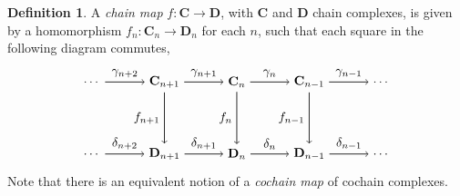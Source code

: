 \documentclass[11.5pt, twoside, a4paper, titlepage]{report}
\providecommand{\equ}[0]{\begin{equation*}}
\providecommand{\eequ}[0] {\end{equation*}}
\theoremstyle{definition}
\newtheorem{mydef}{Definition}[section]
\theoremstyle{plain}
\begin{document}
\begin{mydef}
A \emph{chain map}  $f: \mathbf{C} \to \mathbf{D}$, with $\mathbf{C}$ and $\mathbf{D}$ chain complexes, is given by a homomorphism $f_n: \mathbf{C}_n \to \mathbf{D}_n$ for each $n$, such that each square in the following diagram commutes, 
\equ
\begin{tikzpicture}[->,-latex, auto, every path/.style={->, semithick}, main node/.style={}]
\node	[main node]		(1) at (0,0)		{\dots};
\node	[main node]		(2) at (2,0)		{$\mathbf{C}_{n+1}$};
\node	[main node]		(3) at (4,0)		{$\mathbf{C}_{n}$};
\node [main node]		(4) at (6,0)		{$\mathbf{C}_{n-1}$};
\node [main node]		(5) at (8,0)		{$\dots$};
\node	[main node]		(6) at (0,-2)		{\dots};
\node	[main node]		(7) at (2,-2)		{$\mathbf{D}_{n+1}$};
\node	[main node]		(8) at (4,-2)		{$\mathbf{D}_{n}$};
\node [main node]		(9) at (6,-2)		{$\mathbf{D}_{n-1}$};
\node [main node]		(10) at (8,-2)		{\dots};

\draw (1) edge node [auto] {$\gamma_{n+2}$} (2);
\draw (2) edge node [auto] {$\gamma_{n+1}$} (3);
\draw (3) edge node [auto] {$\gamma_n$} (4);
\draw (4) edge node [auto] {$\gamma_{n-1}$} (5);
\draw (6) edge node [auto] {$\delta_{n+2}$} (7);
\draw (7) edge node [auto] {$\delta_{n+1}$} (8);
\draw (8) edge node [auto] {$\delta_n$} (9);
\draw (9) edge node [auto] {$\delta_{n-1}$} (10);
\draw (2) edge node [auto, swap] {$f_{n+1}$} (7);
\draw (3) edge node [auto, swap] {$f_n$} (8);
\draw (4) edge node [auto, swap] {$f_{n-1}$} (9);
\end{tikzpicture}
\eequ
Note that there is an equivalent notion of a \emph{cochain map} of cochain complexes.
\end{mydef}
\end{document}
